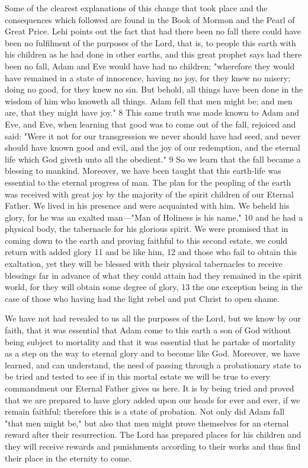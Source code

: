 Some of the clearest explanations of this change that took place and the consequences which
followed are found in the Book of Mormon and the Pearl of Great Price. Lehi points out the
fact that had there been no fall there could have been no fulfilment of the purposes of the
Lord, that is, to people this earth with his children as he had done in other earths, and this
great prophet says had there been no fall, Adam and Eve would have had no children;
"wherefore they would have remained in a state of innocence, having no joy, for they knew
no misery; doing no good, for they knew no sin. But behold, all things have been done in the
wisdom of him who knoweth all things. Adam fell that men might be; and men are, that they
might have joy." 8 This same truth was made known to Adam and Eve, and Eve, when
learning that good was to come out of the fall, rejoiced and said: "Were it not for our
transgression we never should have had seed, and never should have known good and evil,
and the joy of our redemption, and the eternal life which God giveth unto all the obedient." 9
So we learn that the fall became a blessing to mankind. Moreover, we have been taught that
this earth-life was essential to the eternal progress of man. The plan for the peopling of the
earth was received with great joy by the majority of the spirit children of our Eternal Father.
We lived in his presence and were acquainted with him. We beheld his glory, for he was an
exalted man—"Man of Holiness is his name," 10 and he had a physical body, the tabernacle
for his glorious spirit. We were promised that in coming down to the earth and proving
faithful to this second estate, we could return with added glory 11 and be like him, 12 and
those who fail to obtain this exaltation, yet they will be blessed with their physical
tabernacles to receive blessings far in advance of what they could attain had they remained in
the spirit world, for they will obtain some degree of glory, 13 the one exception being in the
case of those who having had the light rebel and put Christ to open shame.

We have not had revealed to us all the purposes of the Lord, but we know by our faith, that it
was essential that Adam come to this earth a son of God without being subject to mortality
and that it was essential that he partake of mortality as a step on the way to eternal glory and
to become like God. Moreover, we have learned, and can understand, the need of passing
through a probationary state to be tried and tested to see if in this mortal estate we will be
true to every commandment our Eternal Father gives us here. It is by being tried and proved
that we are prepared to have glory added upon our heads for ever and ever, if we remain
faithful; therefore this is a state of probation. Not only did Adam fall "that men might be,"
but also that men might prove themselves for an eternal reward after their resurrection. The
Lord has prepared places for his children and they will receive rewards and punishments
according to their works and thus find their place in the eternity to come.

